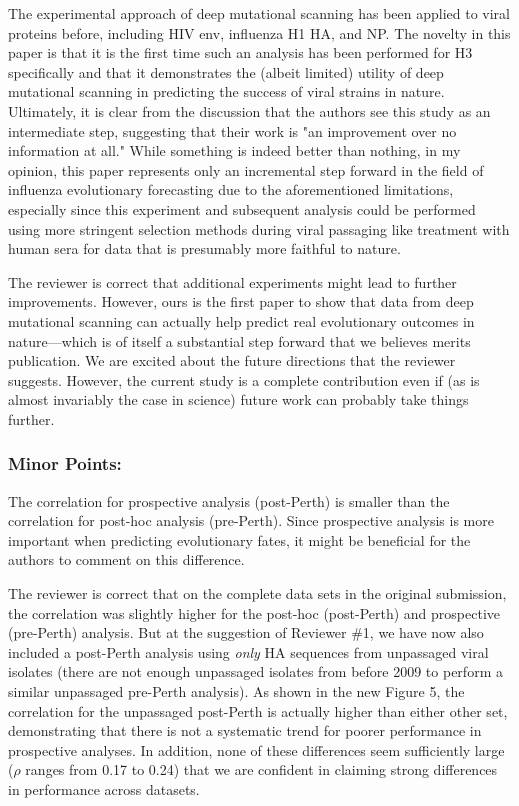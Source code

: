 \documentclass[11pt, oneside]{article}   	%
\newcommand{\response}[1]{{\color{black}#1}}
\begin{document}
The experimental approach of deep mutational scanning has been applied to viral proteins before, including HIV env, influenza H1 HA, and NP. The novelty in this paper is that it is the first time such an analysis has been performed for H3 specifically and that it demonstrates the (albeit limited) utility of deep mutational scanning in predicting the success of viral strains in nature. Ultimately, it is clear from the discussion that the authors see this study as an intermediate step, suggesting that their work is "an improvement over no information at all." While something is indeed better than nothing, in my opinion, this paper represents only an incremental step forward in the field of influenza evolutionary forecasting due to the aforementioned limitations, especially since this experiment and subsequent analysis could be performed using more stringent selection methods during viral passaging like treatment with human sera for data that is presumably more faithful to nature. 

\response{The reviewer is correct that additional experiments might lead to further improvements.
However, ours is the first paper to show that data from deep mutational scanning can actually help predict real evolutionary outcomes in nature---which is of itself a substantial step forward that we believes merits publication.
We are excited about the future directions that the reviewer suggests.
However, the current study is a complete contribution even if (as is almost invariably the case in science) future work can probably take things further.
}

\subsubsection*{Minor Points:} 

The correlation for prospective analysis (post-Perth) is smaller than the correlation for post-hoc analysis (pre-Perth). Since prospective analysis is more important when predicting evolutionary fates, it might be beneficial for the authors to comment on this difference. 

\response{
The reviewer is correct that on the complete data sets in the original submission, the correlation was slightly higher for the post-hoc (post-Perth) and prospective (pre-Perth) analysis.
But at the suggestion of Reviewer \#1, we have now also included a post-Perth analysis using \emph{only} HA sequences from unpassaged viral isolates (there are not enough unpassaged isolates from before 2009 to perform a similar unpassaged pre-Perth analysis).
As shown in the new Figure 5, the correlation for the unpassaged post-Perth is actually higher than either other set, demonstrating that there is not a systematic trend for poorer performance in prospective analyses.
In addition, none of these differences seem sufficiently large ($\rho$ ranges from 0.17 to 0.24) that we are confident in claiming strong differences in performance across datasets.
}
\end{document}
